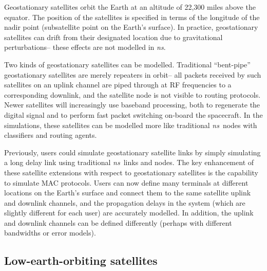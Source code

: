 Geostationary satellites orbit the Earth at an altitude of 22,300 miles 
above the equator.  The position of the satellites is specified in terms
of the longitude of the nadir point (subsatellite point on the Earth's
surface).  In practice, geostationary satellites can drift from their
designated location due to gravitational perturbations-- these effects
are not modelled in \emph{ns}.   

Two kinds of geostationary satellites can be modelled.  Traditional
``bent-pipe'' geostationary satellites are merely repeaters in orbit--
all packets received by such satellites on an uplink channel are piped
through at RF frequencies to a corresponding downlink, and the satellite node
is not visible to routing protocols.   Newer satellites will
increasingly use baseband processing, both to regenerate the digital signal and
to perform fast packet switching on-board
the spacecraft.  In the simulations, these satellites can be modelled more like 
traditional \emph{ns}~nodes with classifiers and routing agents.  
  
Previously, users could simulate geostationary satellite links by simply
simulating a long delay link using traditional \emph{ns}~links and nodes.  The
key enhancement of these satellite extensions with respect to geostationary
satellites is the capability to simulate MAC protocols.  Users can now
define many terminals at different locations on the Earth's surface and
connect them to the same satellite uplink and downlink channels, and the
propagation delays in the system (which are slightly different for each
user) are accurately modelled.  In addition, the uplink and downlink channels
can be defined differently (perhaps with different bandwidths or error models).


\subsection{Low-earth-orbiting satellites}
\label{sec:satellite/overview/leo}


